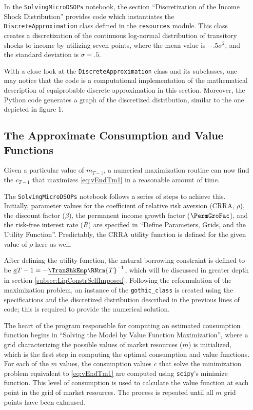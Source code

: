 \documentclass[titlepage, headings=optiontotocandhead]{\econtex}
\begin{document}
In the \texttt{SolvingMicroDSOPs} notebook, the section ``Discretization of the Income Shock Distribution'' provides code which instantiates the \texttt{DiscreteApproximation} class defined in the \texttt{resources} module. This class creates a discretization of the continuous log-normal distribution of transitory shocks to income by utilizing seven points, where the mean value is $-.5 \sigma^2$, and the standard deviation is $\sigma = .5$.

With a close look at the \texttt{DiscreteApproximation} class and its subclasses, one may notice that the code is a computational implementation of the mathematical description of equiprobable discrete approximation in this section. Moreover, the Python code generates a graph of the discretized distribution, similar to the one depicted in figure 1.

\hypertarget{The-Approximate-Consumption-and-Value-Functions}{}
\subsection{The Approximate Consumption and Value Functions}

Given a particular value of ${m}_{T-1}$, a numerical maximization routine can now find the ${c}_{T-1}$ that maximizes \eqref{eq:vEndTm1} in a reasonable amount of time.

The \texttt{SolvingMicroDSOPs} notebook follows a series of steps to achieve this. Initially, parameter values for the coefficient of relative risk aversion (CRRA, $\rho$), the discount factor ($\beta$), the permanent income growth factor ($\PermGroFac$), and the risk-free interest rate ($R$) are specified in ``Define Parameters, Grids, and the  Utility Function''. Predictably, the CRRA utility function is defined for the given value of $\rho$ here as well.

After defining the utility function, the natural borrowing constraint is defined to be $\underline{a}{T-1}=-\underline{\TranShkEmp}\RNrm{T}^{-1}$, which will be discussed in greater depth in section \ref{subsec:LiqConstrSelfImposed}. Following the reformulation of the maximization problem, an instance of the \texttt{gothic\_class} is created using the specifications and the discretized distribution described in the previous lines of code; this is required to provide the numerical solution.

The heart of the program responsible for computing an estimated consumption function begins in ``Solving the Model by Value Function Maximization'', where a grid characterizing the possible values of market resources ($m$) is initialized, which is the first step in computing the optimal consumption and value functions. For each of the $m$ values, the consumption values $c$ that solve the minimization problem equivalent to \eqref{eq:vEndTm1} are computed using \texttt{scipy}'s minimize function. This level of consumption is used to calculate the value function at each point in the grid of market resources. The process is repeated until all $m$ grid points have been exhaused.
\end{document}
